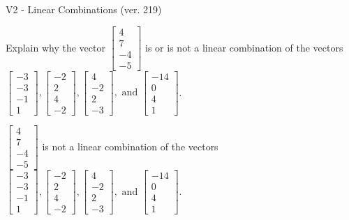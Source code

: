 \begin{exercise}
  \begin{exerciseTitle}V2 - Linear Combinations (ver. 219)\end{exerciseTitle}
  \begin{exerciseStatement}
    Explain why the vector \(\left[\begin{array}{c}
4 \\
7 \\
-4 \\
-5
\end{array}\right]\)  is or is not a linear 
	combination of the vectors \(\left[\begin{array}{c}
-3 \\
-3 \\
-1 \\
1
\end{array}\right] , \left[\begin{array}{c}
-2 \\
2 \\
4 \\
-2
\end{array}\right] , \left[\begin{array}{c}
4 \\
-2 \\
2 \\
-3
\end{array}\right] , \text{ and } \left[\begin{array}{c}
-14 \\
0 \\
4 \\
1
\end{array}\right]\).
	


  \end{exerciseStatement}
  \begin{exerciseAnswer}
   \(\left[\begin{array}{c}
4 \\
7 \\
-4 \\
-5
\end{array}\right]\) 
  	 is not  
	a linear combination of the vectors \(\left[\begin{array}{c}
-3 \\
-3 \\
-1 \\
1
\end{array}\right] , \left[\begin{array}{c}
-2 \\
2 \\
4 \\
-2
\end{array}\right] , \left[\begin{array}{c}
4 \\
-2 \\
2 \\
-3
\end{array}\right] , \text{ and } \left[\begin{array}{c}
-14 \\
0 \\
4 \\
1
\end{array}\right]\).


\end{exerciseAnswer}
\end{exercise}
